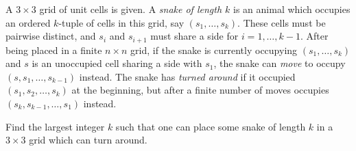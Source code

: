 A $3 \times 3$ grid of unit cells is given. A \emph{snake of length $k$} is an animal which occupies an ordered $k$-tuple of cells in this grid, say $(s_1, \dots, s_k)$. These cells must be pairwise distinct, and $s_i$ and $s_{i+1}$ must share a side for $i = 1, \dots, k-1$. After being placed in a finite $n \times n$ grid, if the snake is currently occupying $(s_1, \dots, s_k)$ and $s$ is an unoccupied cell sharing a side with $s_1$, the snake can \emph{move} to occupy $(s, s_1, \dots, s_{k-1})$ instead. The snake has \emph{turned around} if it occupied $(s_1, s_2, \dots, s_k)$ at the beginning, but after a finite number of moves occupies $(s_k, s_{k-1}, \dots, s_1)$ instead.

Find the largest integer $k$ such that one can place some snake of length $k$ in a $3 \times 3$ grid which can turn around.